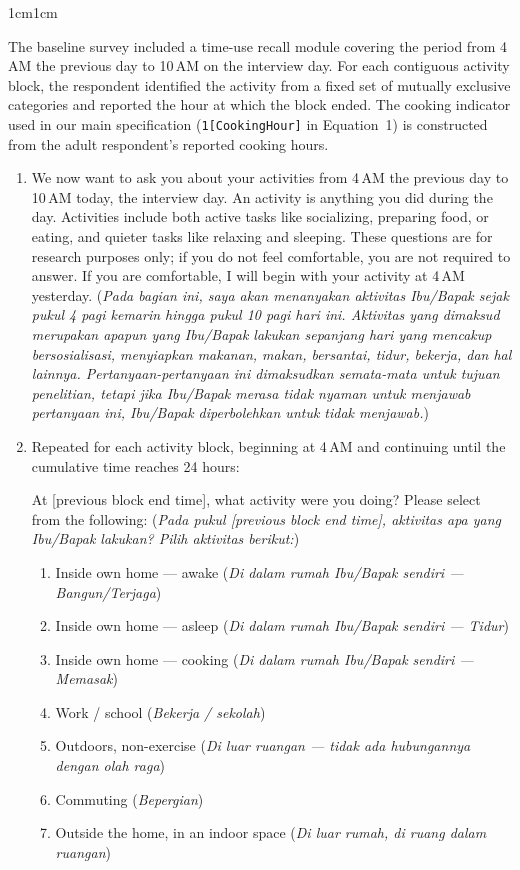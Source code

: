 \documentclass[9pt,twoside]{pnas-new}
\begin{document}
\begin{adjustwidth}{1cm}{1cm}
\begin{enumerate}
\end{enumerate}

\noindent The baseline survey included a time-use recall module covering the period from 4\,AM the previous day to 10\,AM on the interview day. For each contiguous activity block, the respondent identified the activity from a fixed set of mutually exclusive categories and reported the hour at which the block ended. The cooking indicator used in our main specification (\texttt{1[CookingHour]} in Equation~1) is constructed from the adult respondent's reported cooking hours.

\begin{enumerate}
\setcounter{enumi}{\value{your_last_question_number}}

\item We now want to ask you about your activities from 4\,AM the previous day to 10\,AM today, the interview day. An activity is anything you did during the day. Activities include both active tasks like socializing, preparing food, or eating, and quieter tasks like relaxing and sleeping. These questions are for research purposes only; if you do not feel comfortable, you are not required to answer. If you are comfortable, I will begin with your activity at 4\,AM yesterday. (\emph{Pada bagian ini, saya akan menanyakan aktivitas Ibu/Bapak sejak pukul 4 pagi kemarin hingga pukul 10 pagi hari ini. Aktivitas yang dimaksud merupakan apapun yang Ibu/Bapak lakukan sepanjang hari yang mencakup bersosialisasi, menyiapkan makanan, makan, bersantai, tidur, bekerja, dan hal lainnya. Pertanyaan-pertanyaan ini dimaksudkan semata-mata untuk tujuan penelitian, tetapi jika Ibu/Bapak merasa tidak nyaman untuk menjawab pertanyaan ini, Ibu/Bapak diperbolehkan untuk tidak menjawab.})

\item Repeated for each activity block, beginning at 4\,AM and continuing until the cumulative time reaches 24 hours:

At [previous block end time], what activity were you doing? Please select from the following: (\emph{Pada pukul [previous block end time], aktivitas apa yang Ibu/Bapak lakukan? Pilih aktivitas berikut:})
    \begin{enumerate}
        \item Inside own home --- awake (\emph{Di dalam rumah Ibu/Bapak sendiri --- Bangun/Terjaga})
        \item Inside own home --- asleep (\emph{Di dalam rumah Ibu/Bapak sendiri --- Tidur})
        \item Inside own home --- cooking (\emph{Di dalam rumah Ibu/Bapak sendiri --- Memasak})
        \item Work / school (\emph{Bekerja / sekolah})
        \item Outdoors, non-exercise (\emph{Di luar ruangan --- tidak ada hubungannya dengan olah raga})
        \item Commuting (\emph{Bepergian})
        \item Outside the home, in an indoor space (\emph{Di luar rumah, di ruang dalam ruangan})
    \end{enumerate}


\end{enumerate}
\end{adjustwidth}
\end{document}
